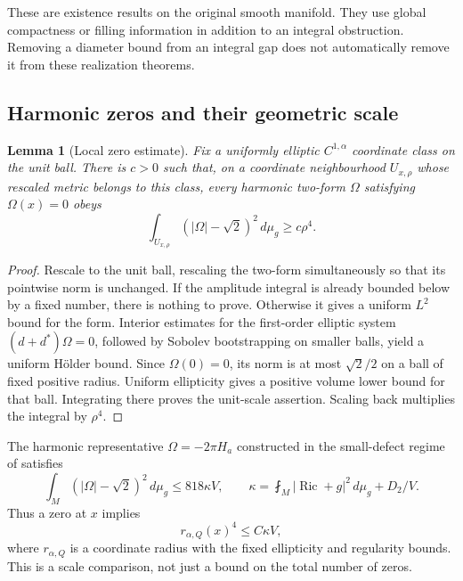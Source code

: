 \documentclass[11pt,a4paper]{article}
\newtheorem{lemma}[theorem]{Lemma}
\theoremstyle{definition}\newtheorem{definition}[theorem]{Definition}
\theoremstyle{remark}\newtheorem{remark}[theorem]{Remark}
\DeclareMathOperator{\Ric}{Ric}
\newcommand{\avint}{\mathop{\fint}}
\newcommand{\dd}{\,d\mu_g}
\begin{document}
These are existence results on the original smooth manifold. They use global compactness or filling information in addition to an integral obstruction. Removing a diameter bound from an integral gap does not automatically remove it from these realization theorems.

\subsection{Harmonic zeros and their geometric scale}
\begin{lemma}[Local zero estimate]\label{lem:zero}
Fix a uniformly elliptic $C^{1,\alpha}$ coordinate class on the unit ball. There is $c>0$ such that, on a coordinate neighbourhood $U_{x,\rho}$ whose rescaled metric belongs to this class, every harmonic two-form $\Omega$ satisfying $\Omega(x)=0$ obeys
\begin{equation}\label{eq:zero-cost}
 \int_{U_{x,\rho}}(|\Omega|-\sqrt2)^2\dd\ge c\rho^4.
\end{equation}
\end{lemma}
\begin{proof}
Rescale to the unit ball, rescaling the two-form simultaneously so that its pointwise norm is unchanged. If the amplitude integral is already bounded below by a fixed number, there is nothing to prove. Otherwise it gives a uniform $L^2$ bound for the form. Interior estimates for the first-order elliptic system $(d+d^*)\Omega=0$, followed by Sobolev bootstrapping on smaller balls, yield a uniform H\"older bound. Since $\Omega(0)=0$, its norm is at most $\sqrt2/2$ on a ball of fixed positive radius. Uniform ellipticity gives a positive volume lower bound for that ball. Integrating there proves the unit-scale assertion. Scaling back multiplies the integral by $\rho^4$.
\end{proof}

The harmonic representative $\Omega=-2\pi H_a$ constructed in the small-defect regime of \cite{source-zeros} satisfies
\begin{equation}\label{eq:amplitude}
 \int_M(|\Omega|-\sqrt2)^2\dd\le818\kappa V,
 \qquad \kappa=\avint_M|\Ric+g|^2\dd+D_2/V.
\end{equation}
Thus a zero at $x$ implies
\begin{equation}\label{eq:zero-scale}
 r_{\alpha,Q}(x)^4\le C\kappa V,
\end{equation}
where $r_{\alpha,Q}$ is a coordinate radius with the fixed ellipticity and regularity bounds. This is a scale comparison, not just a bound on the total number of zeros.
\end{document}
